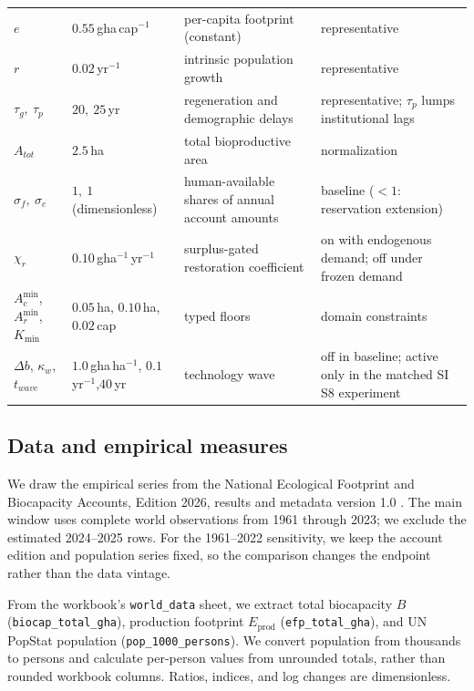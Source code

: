 \documentclass[preprint,12pt,authoryear]{elsarticle}
\newcommand{\Acmin}{A_c^{\min}}
\begin{document}
\begin{table}[!htbp]
\begin{tabularx}{\textwidth}{@{}>{\raggedright\arraybackslash}p{} >{\raggedright\arraybackslash}p{} >{\raggedright\arraybackslash}X >{\raggedright\arraybackslash}p{}@{}}
$e$ & $0.55$\,gha\,cap$^{-1}$ & per-capita footprint (constant) & representative \\
$r$ & $0.02$\,yr$^{-1}$ & intrinsic population growth & representative \\
$\tau_g,\ \tau_p$ & $20,\ 25$\,yr & regeneration and demographic delays & representative; $\tau_p$ lumps institutional lags \\
$A_{tot}$ & $2.5$\,ha & total bioproductive area & normalization \\
$\sigma_f,\ \sigma_c$ & $1,\ 1$ (dimensionless) & human-available shares of annual account amounts & baseline ($<1$: reservation extension) \\
$\chi_r$ & $0.10$\,gha$^{-1}$\,yr$^{-1}$ & surplus-gated restoration coefficient & on with endogenous demand; off under frozen demand \\
$\Acmin$, $A_r^{\min}$,\newline $K_{\min}$ & $0.05$\,ha, $0.10$\,ha,\newline $0.02$\,cap & typed floors & domain constraints \\
$\Delta b$, $\kappa_w$,\newline $t_{wave}$ & $1.0$\,gha\,ha$^{-1}$, $0.1$\,yr$^{-1}$,\newline $40$\,yr & technology wave & off in baseline; active only in the matched SI S8 experiment \\
\bottomrule
\end{tabularx}
\end{table}

\subsection{Data and empirical measures}\label{sec:data}

We draw the empirical series from the National Ecological Footprint and Biocapacity Accounts, Edition 2026, results and metadata version 1.0 \citep{Lo2026NFA}. The main window uses complete world observations from 1961 through 2023; we exclude the estimated 2024--2025 rows. For the 1961--2022 sensitivity, we keep the account edition and population series fixed, so the comparison changes the endpoint rather than the data vintage.

From the workbook's \texttt{world\_data} sheet, we extract total biocapacity $B$ (\texttt{biocap\_total\_gha}), production footprint $E_{\mathrm{prod}}$ (\texttt{efp\_total\_gha}), and UN PopStat population (\texttt{pop\_1000\_persons}). We convert population from thousands to persons and calculate per-person values from unrounded totals, rather than rounded workbook columns. Ratios, indices, and log changes are dimensionless.
\end{document}
